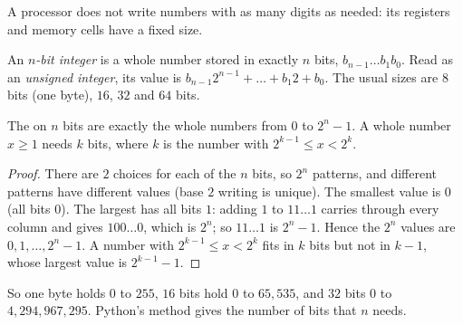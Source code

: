 \label{lst:g10:machine-integers:to-base}

\label{out:g10:machine-integers:to-base}

A processor does not write numbers with as many digits as needed: its registers and memory cells have a fixed
size.

\begin{definition}\label{def:g10:machine-integers:unsigned}
An \emph{$n$-bit integer} is a whole number stored in exactly $n$ bits,
$b_{n-1} \dots b_1 b_0$. Read as an \emph{unsigned integer}, its value is
$b_{n-1} 2^{n-1} + \dots + b_1 2 + b_0$. The usual sizes are $8$ bits (one byte), $16$, $32$ and $64$ bits.
\end{definition}

\begin{proposition}\label{prop:g10:machine-integers:range}
The  on $n$ bits are exactly the whole numbers from $0$ to $2^n - 1$. A whole number $x \ge 1$ needs
$k$ bits, where $k$ is the number with $2^{k-1} \le x < 2^k$.
\end{proposition}

\begin{proof}
There are $2$ choices for each of the $n$ bits, so $2^n$ patterns, and different patterns have different values
(base $2$ writing is unique). The smallest value is $0$ (all bits $0$). The largest has all bits $1$: adding $1$ to
$11\dots1$ carries through every column and gives $100\dots0$, which is $2^n$; so $11\dots1$ is $2^n - 1$. Hence the
$2^n$ values are $0, 1, \dots, 2^n - 1$. A number with $2^{k-1} \le x < 2^k$ fits in $k$ bits but not in $k - 1$,
whose largest value is $2^{k-1} - 1$.
\end{proof}

So one byte holds $0$ to $255$, $16$ bits hold $0$ to $65{,}535$, and $32$ bits $0$ to $4{,}294{,}967{,}295$.
Python's method  gives the number of bits that $n$ needs.

\label{lst:g10:machine-integers:bits-needed}

